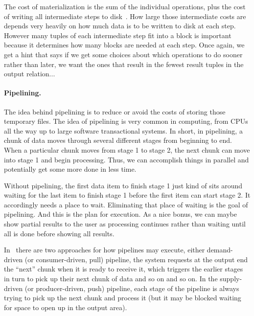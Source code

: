 \documentclass[a4paper]{report}
\begin{document}
The cost of materialization is the sum of the individual operations, plus the cost of writing all intermediate steps to disk~\cite{dsc}. How large those intermediate costs are depends very heavily on how much data is to be written to disk at each step. However many tuples of each intermediate step fit into a block is important because it determines how many blocks are needed at each step. Once again, we get a hint that says if we get some choices about which operations to do sooner rather than later, we want the ones that result in the fewest result tuples in the output relation...

\paragraph{Pipelining.}
The idea behind pipelining is to reduce or avoid the costs of storing those temporary files. The idea of pipelining is very common in computing, from CPUs all the way up to large software transactional systems. In short, in pipelining, a chunk of data moves through several different stages from beginning to end. When a particular chunk moves from stage 1 to stage 2, the next chunk can move into stage 1 and begin processing. Thus, we can accomplish things in parallel and potentially get some more done in less time.

Without pipelining, the first data item to finish stage 1 just kind of sits around waiting for the last item to finish stage 1 before the first item can start stage 2. It accordingly needs a place to wait. Eliminating that place of waiting is the goal of pipelining. And this is the plan for execution. As a nice bonus, we can maybe show partial results to the user as processing continues rather than waiting until all is done before showing all results. 

In~\cite{dsc} there are two approaches for how pipelines may execute, either demand-driven (or consumer-driven, pull) pipeline, the system requests at the output end the ``next'' chunk when it is ready to receive it, which triggers the earlier stages in turn to pick up their next chunk of data and so on and so on. In the supply-driven (or producer-driven, push) pipeline, each stage of the pipeline is always trying to pick up the next chunk and process it (but it may be blocked waiting for space to open up in the output area). 
\end{document}
